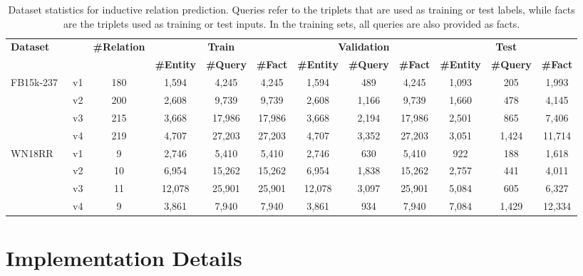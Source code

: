 \begin{table}[!h]
    \centering
    \caption{Dataset statistics for inductive relation prediction. Queries refer to the triplets that are used as training or test labels, while facts are the triplets used as training or test inputs. In the training sets, all queries are also provided as facts.}
    \label{tab:inductive_statistics}
    \begin{adjustbox}{max width=\textwidth}
        \begin{tabular}{llcccccccccc}
            \toprule
            \multirow{2}{*}{\bf{Dataset}} & & \multirow{2}{*}{\bf{\#Relation}} & \multicolumn{3}{c}{\bf{Train}} & \multicolumn{3}{c}{\bf{Validation}} & \multicolumn{3}{c}{\bf{Test}} \\
            & & & \bf{\#Entity} & \bf{\#Query} & \bf{\#Fact} & \bf{\#Entity} & \bf{\#Query} & \bf{\#Fact} & \bf{\#Entity} & \bf{\#Query} & \bf{\#Fact} \\
            \midrule
            \multirow{4}{*}{FB15k-237~\cite{teru2020inductive}}
            & v1 & 180 & 1,594 & 4,245 & 4,245 & 1,594 & 489 & 4,245 & 1,093 & 205 & 1,993\\
            & v2 & 200 & 2,608 & 9,739 & 9,739 & 2,608 & 1,166 & 9,739 & 1,660 & 478 & 4,145 \\
            & v3 & 215 & 3,668 & 17,986 & 17,986 & 3,668 & 2,194 & 17,986 & 2,501 & 865 & 7,406 \\
            & v4 & 219 & 4,707 & 27,203 & 27,203 & 4,707 & 3,352 & 27,203 & 3,051 & 1,424 & 11,714 \\
            \multirow{4}{*}{WN18RR~\cite{teru2020inductive}}
            & v1 & 9 & 2,746 & 5,410 & 5,410 & 2,746 & 630 & 5,410 & 922 & 188 & 1,618 \\
            & v2 & 10 & 6,954 & 15,262 & 15,262 & 6,954 & 1,838 & 15,262 & 2,757 & 441 & 4,011\\
            & v3 & 11 & 12,078 & 25,901 & 25,901 & 12,078 & 3,097 & 25,901 & 5,084 & 605 & 6,327\\
            & v4 & 9 & 3,861 & 7,940 & 7,940 & 3,861 & 934 & 7,940 & 7,084 & 1,429 & 12,334 \\
            \bottomrule
        \end{tabular}
    \end{adjustbox}
\end{table}


\section{Implementation Details}
\label{app:implementation}

